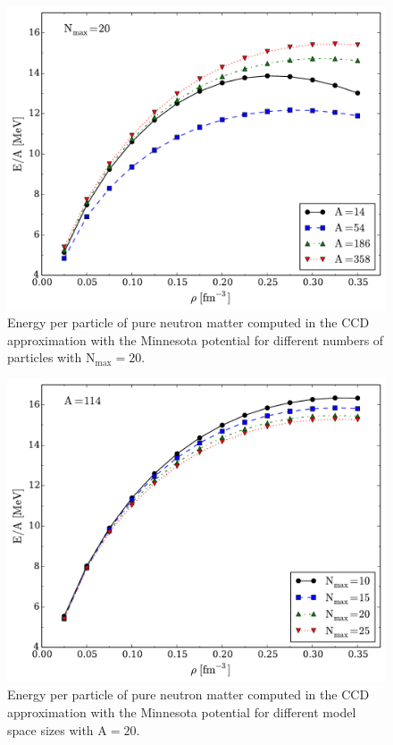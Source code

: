 \begin{figure}
  \includegraphics[width=\linewidth]{Chapter8-figures/fig1.pdf}
  \caption{Energy per particle of pure neutron matter computed in the CCD approximation with the Minnesota potential for different numbers of particles with $\mathrm{N_{max}=20}$.}
  \label{fig:fig1}
\end{figure}

\begin{figure}
  \includegraphics[width=\linewidth]{Chapter8-figures/fig2.pdf}
  \caption{Energy per particle of pure neutron matter computed in the CCD approximation with the Minnesota potential for different model space sizes with $\mathrm{A=20}$.}
  \label{fig:fig2}
\end{figure}

